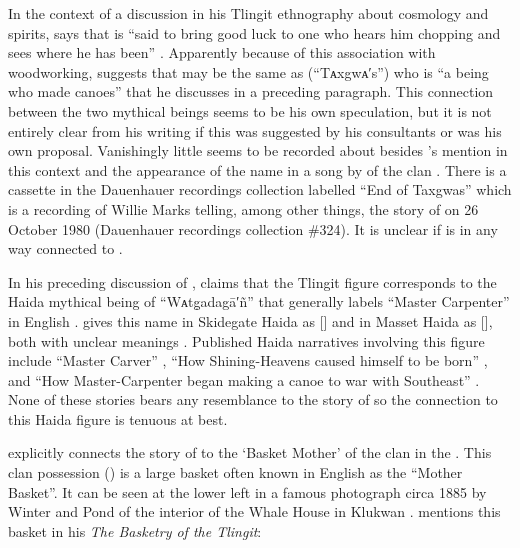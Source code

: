 In the context of a discussion in his Tlingit ethnography about cosmology and spirits, \citeauthor{swanton:1908} says that  is “said to bring good luck to one who hears him chopping and sees where he has been” \parencite[460]{swanton:1908}.
Apparently because of this association with woodworking, \citeauthor{swanton:1908} suggests that  may be the same as  (“Tᴀxgwᴀ′s”) who is “a being who made canoes” that he discusses in a preceding paragraph.
This connection between the two mythical beings seems to be his own speculation, but it is not entirely clear from his writing if this was suggested by his consultants or was his own proposal.
Vanishingly little seems to be recorded about  besides \citeauthor{swanton:1908}’s mention in this context and the appearance of the name in a song by  of the  clan \parencite[410–411 \#82]{swanton:1909}.
There is a cassette in the Dauenhauer recordings collection labelled “End of Taxgwas” which is a recording of  Willie Marks telling, among other things, the story of  on 26 October 1980 (Dauenhauer recordings collection \#324).
It is unclear if  is in any way connected to .

In his preceding discussion of  \parencite[460]{swanton:1909}, \citeauthor{swanton:1908} claims that the Tlingit figure corresponds to the Haida mythical being of “Wᴀtg̣adagā′ñ” that \citeauthor{swanton:1909} generally labels “Master Carpenter” in English \parencite[30]{swanton:1905b}.
\citeauthor{enrico:2005} gives this name in Skidegate Haida as  [] and in Masset Haida as  [], both with unclear meanings \parencite[1623]{enrico:2005}.
Published Haida narratives involving this figure include “Master Carver” \parencite[91]{garfield-forrest:1948}, “How Shining-Heavens caused himself to be born” \parencites[26–31]{swanton:1905b}[284–292]{swanton:1908a}, and “How Master-Carpenter began making a canoe to war with Southeast” \parencite[32–35]{swanton:1905b}.
None of these stories bears any resemblance to the story of  so the connection to this Haida figure is tenuous at best.

\citeauthor{paul:1944} explicitly connects the story of  to the  ‘Basket Mother’ of the  clan in the  \parencite[69]{paul:1944}.
This clan possession () is a large basket often known in English as the “Mother Basket”.
It can be seen at the lower left in a famous photograph circa 1885 by Winter and Pond of the interior of the  Whale House in Klukwan \parencite[63]{emmons:1991}.
\citeauthor{emmons:1903} mentions this basket in his \textit{The Basketry of the Tlingit}:


